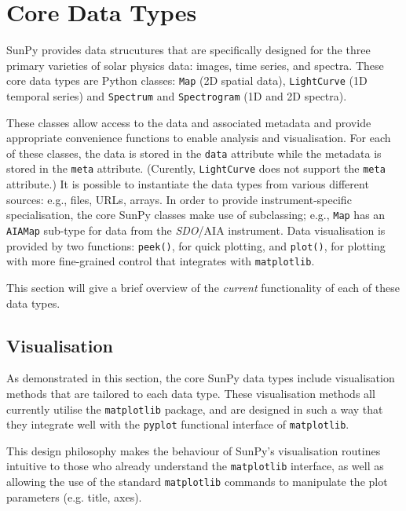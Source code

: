 \section{Core Data Types}\label{sec:DataTypes}

SunPy provides data strucutures that are specifically designed for the
three primary varieties of solar physics data: images, time series, and
spectra. These core data types are Python classes:
\texttt{Map} (2D spatial data), \texttt{LightCurve} (1D temporal series)
and \texttt{Spectrum} and \texttt{Spectrogram} (1D and 2D spectra). 

These classes allow access to the data
and associated metadata and provide appropriate convenience functions to
enable analysis and visualisation. For each of these classes, the data is
stored in the \texttt{data} attribute while the metadata is stored 
in the \texttt{meta} attribute. (Curently, \texttt{LightCurve} does 
not support the \texttt{meta} attribute.) 
It is possible to instantiate the
data types from various
different sources: e.g., files, URLs, arrays.  
In order to provide instrument-specific specialisation, the core SunPy classes 
make use of subclassing; e.g., \texttt{Map} has an \texttt{AIAMap} 
sub-type for data from the \textit{SDO}/AIA instrument. 
Data visualisation is provided by two functions: \texttt{peek()}, for quick 
plotting, and \texttt{plot()}, for plotting with more fine-grained control that 
integrates with \texttt{matplotlib}.

This section will give a brief overview of the \textit{current} functionality 
of each of these data types.





\subsection{Visualisation}
\label{subsec:Viz}
As demonstrated in this section, the core SunPy data types 
include visualisation methods that are tailored to each data type. 
These visualisation methods all currently utilise the \texttt{matplotlib} 
package, and are designed in such a way that they integrate well with 
the \texttt{pyplot} functional interface of \texttt{matplotlib}.

This design philosophy makes the behaviour of SunPy's visualisation 
routines intuitive to those who already understand the \texttt{matplotlib}
interface, as well as allowing the use of the standard 
\texttt{matplotlib} commands to manipulate the plot parameters (e.g. title, axes).
